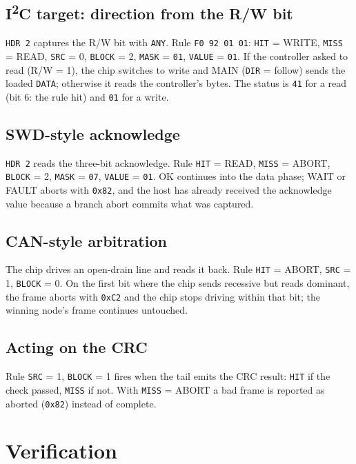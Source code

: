 \documentclass[11pt,a4paper]{article}
\newcommand{\sig}[1]{\texttt{#1}}
\begin{document}
\subsection{I\textsuperscript{2}C target: direction from the R/W bit}

\sig{HDR 2} captures the R/W bit with \sig{ANY}. Rule \texttt{F0 92 01 01}: \sig{HIT} = WRITE, \sig{MISS} = READ, \sig{SRC} = 0, \sig{BLOCK} = 2, \sig{MASK} = \texttt{01}, \sig{VALUE} = \texttt{01}. If the controller asked to read (R/W = 1), the chip switches to write and MAIN (\sig{DIR} = follow) sends the loaded \sig{DATA}; otherwise it reads the controller's bytes. The status is \texttt{41} for a read (bit 6: the rule hit) and \texttt{01} for a write.

\subsection{SWD-style acknowledge}

\sig{HDR 2} reads the three-bit acknowledge. Rule \sig{HIT} = READ, \sig{MISS} = ABORT, \sig{BLOCK} = 2, \sig{MASK} = \texttt{07}, \sig{VALUE} = \texttt{01}. OK continues into the data phase; WAIT or FAULT aborts with \texttt{0x82}, and the host has already received the acknowledge value because a branch abort commits what was captured.

\subsection{CAN-style arbitration}

The chip drives an open-drain line and reads it back. Rule \sig{HIT} = ABORT, \sig{SRC} = 1, \sig{BLOCK} = 0. On the first bit where the chip sends recessive but reads dominant, the frame aborts with \texttt{0xC2} and the chip stops driving within that bit; the winning node's frame continues untouched.

\subsection{Acting on the CRC}

Rule \sig{SRC} = 1, \sig{BLOCK} = 1 fires when the tail emits the CRC result: \sig{HIT} if the check passed, \sig{MISS} if not. With \sig{MISS} = ABORT a bad frame is reported as aborted (\texttt{0x82}) instead of complete.

\section{Verification}
\end{document}
